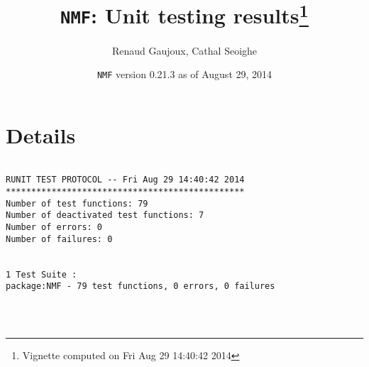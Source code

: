 \documentclass[10pt]{article}\usepackage[]{graphicx}\usepackage[]{color}
\author{Renaud Gaujoux, Cathal Seoighe}
\title{\texttt{NMF}: Unit testing results\footnote{Vignette computed  on Fri Aug 29 14:40:42 2014}}
\date{\texttt{NMF} version 0.21.3 as of August 29, 2014}
\begin{document}
\maketitle

\section{Details}
\begin{verbatim}

RUNIT TEST PROTOCOL -- Fri Aug 29 14:40:42 2014 
*********************************************** 
Number of test functions: 79 
Number of deactivated test functions: 7 
Number of errors: 0 
Number of failures: 0 

 
1 Test Suite : 
package:NMF - 79 test functions, 0 errors, 0 failures




\end{verbatim}
\end{document}
